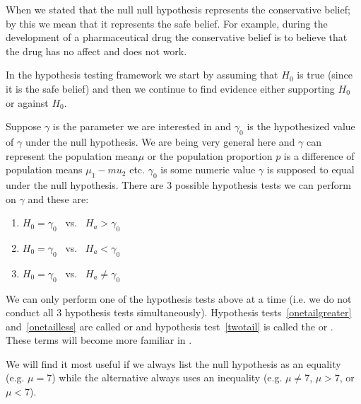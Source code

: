 When we stated that the null null hypothesis represents the conservative belief;
by this we mean that it represents the safe belief.
For example, during the development of a pharmaceutical drug the conservative belief
is to believe that the drug has no affect and does not work. 

In the hypothesis testing framework we start by assuming that $H_{0}$ is true 
(since it is the safe belief) and then we continue to find evidence either supporting 
$H_{0}$ or against $H_{0}$.

Suppose $\gamma$ is the parameter we are interested in and $\gamma_{0}$ is the hypothesized value of 
$\gamma$ under the null hypothesis. 
We are being very general here and $\gamma$ can represent the population mean$\mu$ or
the population proportion $p$ is a difference of population means $\mu_1 - mu_2$ etc.
$\gamma_{0}$ is some numeric value $\gamma$ is supposed to equal under the null hypothesis.
There are 3 possible hypothesis tests we can perform on $\gamma$ and these are:\\

\begin{enumerate}
\item	$H_{0} = \gamma_{0}$ ~vs.~ $H_{a} > \gamma_{0}$	\label{onetailgreater}
\item	$H_{0} = \gamma_{0}$ ~vs.~ $H_{a} < \gamma_{0}$	\label{onetailless}
\item	$H_{0} = \gamma_{0}$ ~vs.~ $H_{a} \neq \gamma_{0}$	\label{twotail}
\end{enumerate}

We can only perform one of the hypothesis tests above at a time 
(i.e. we do not conduct all 3 hypothesis tests simultaneously).
Hypothesis tests~\ref{onetailgreater} and~\ref{onetailless} are called 
 or 
and hypothesis test~\ref{twotail} is called the 
or .
These terms will become more familiar in {\color{red}{Chapter ???}}.



\begin{tipBox}{
We will find it most useful if we always list the null hypothesis as an equality (e.g. $\mu = 7$) while the alternative always uses an inequality (e.g. $\mu\neq7$, $\mu>7$, or $\mu<7$).}
\end{tipBox}


